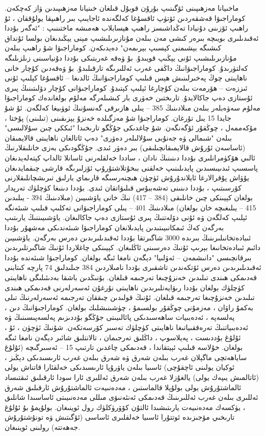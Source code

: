 \documentclass[a4paper]{article}
\begin{document}
\begin{flushright}
ماخىيانا مەزھىپىنى ئۆگىنىپ بۇرۇن قوبۇل قىلغان خىنيانا مەزھىپىدىن ۋاز كەچكەن. كوماراجىۋا قەشقەردىن ئۆتۈپ ئاقسۇغا كەلگەندە ئاجايىپ بىر راھىپقا يولۇققان ، ئۇ راھىپ ئۆزىنى دۇنيادا تەڭداشىسز راھىپ ھېسابلاب ھەمىشە ماختىنىپ : "ئەگەر بۇددا ئەقىدىلىرى بويىچە بىرەر كىشى مەن بىلەن مۇنازىرىلىشىپ مېنى يېڭىدىغان بولسا ئۇنداق كىشىگە بېشىمنى كېسىپ بېرىمەن" دەيدىكەن. كوماراجىۋا شۇ راھىپ بىلەن مۇنازىرىلىشىپ ئۇنى يېڭىپ قويىدۇ. بۇ ۋەقە غەربتىكى بۇددا دۇنياسىنى زىلزىلىگە كەلتۈرىدۇ. كوماراجىۋانىڭ داڭقى غەرب ئەللىرىگە تارقىلىدۇ. بۇ ۋەقەدىن كۇچار خانى ناھايىتى چوڭ پەخىرلىنىش ھېس قىلىپ كوماراجىۋانىڭ ئالدىغا – ئاقسۇغا كېلىپ ئۇنى ئىززەت – ھۆرمەت بىلەن كۇچارغا ئېلىپ كېتىدۇ. كوماراجىۋانى كۇچار دۆلىتىنىڭ پىرى ئۇستازى دەپ جاكالايدۇ. تارىختىن خەۋرى بار كىشىلەرگە مەلۇم بولغاندەك كوماراجىۋا مەلۇم سەۋەبلەر بىلەن مىلادىنىڭ 385 – يىلى ھازىرقى گەنسۇنىڭ ئوۋىيغا كەلگەن. ئۇ شۇ جايدا 15 يىل تۇرغان. كوماراجىۋا شۇ مەزگىلدە خەنزۇ يېزىقىنى (تىلىنى) پۇختا ، مۇكەممەل ، چوڭقۇر ئۆگەنگەن. شۇ چاغدىكى جۇڭگو تارىخىدا "ئىككى چىن سۇلالىسى" بىلەن "شىمالى ۋە جەنۇبى سۇلالىلەر دەۋرى" دەپ ئاتالغان ناھايىتى قالايمىقان (ئاساسەن ئۇرۇش قالايمىقانچىلىقى) بىر دەۋر ئىدى. جۇڭگودىكى بەزى خانلىقلارنىڭ ئالىي ھۆكۈمرانلىرى بۇددا دىنىنىڭ نادان ، ساددا خەلقلەرنى ئاسانلا ئالداپ كېتەلەيدىغان پاسسىپ ئىدىيىسىدىن پايدىلىنىپ خەلقنى بىخۇتلاشتۇرۇپ ئۆزلىرىگە قارشى چىقمايدىغان يۇۋاش پۇقرالارغا ئايلاندۇرۇش ئۈچۈن ھىچنەرسىگە قارىماي بارلىق تىرىشچانلىقلارنى كۆرسىتىپ ، بۇددا دىنىنى تەشەببۇس قىلىۋاتقان ئىدى. بۇددا دىنىغا كۈچلۈك تەرپدار بولغان كېيىنكى چىن خانلىقى (384 – 417) نىڭ خانى ياۋشىيىن (مىلادىنىڭ 394 - يىلىدىن 415 – يىلىغىچە خان بولغان) مىلادىنىڭ 401 – يىلى كوماراجىۋانى تەكلىپ قىلىپ شىئەنگە ئېلىپ كەلگەن ۋە ئۇنى دۆلەتنىڭ پىرى ئۇستازى دەپ جاكالىغان. ياۋشىيىننىڭ يارىتىپ بەرگەن كەڭ ئىمكانىيىتىدىن پايدىلانغان كوماراجىۋا شىئەندىكى مەشھۇر بۇددا ئىبادەتخانىلىرىنىڭ بىرىدە 3000 شاگىرتقا بۇددا ئەقىدىلىرىدىن دەرس بەرگەن. ياۋشىيىن دائىم ئىبادەتخانىغا بېرىپ ئۇنىڭ دەرسىنى ئاڭلىغان. كېيىنكى چاغلاردا ئۇنىڭ شاگىرتلىرىدىن بىرقانچىسى "دانىشمەن – ئەۋلىيا" دېگەن نامغا ئىگە بولغان. كوماراجىۋا شىئەندە بۇددا ئەقىدىلىرىدىن دەرس ئۆتكەندىن تاشقىرى بۇددا نامىلاردىن 384 جىلىدلىق 74 پارچە كىتابنى قەدىمكى ھىندى تىلىدىن خەنزۇچىغا تەرجىمە قىلغان. بۇنىڭدىن باشقا بەدىئىلىگى ناھايىتى كۈچلۈك بولغان بۇددا رىۋايەتلىرىدىن ناھايىتى نۇرغۇن ئەسەرلەرنى قەدىمكى ھىندى تىلىدىن خەنزۇچىغا تەرجىمە قىلغان. ئۇنىڭ قولىدىن چىققان تەرجىمە ئەسەرلەرنىڭ تىلى بەكمۇ راۋان ، مەزمۇنى چوڭقۇر بولسىمۇ ، چۈشىنىشلىك بولغان. كوماراجىۋانىڭ دىن ، پەلسەپە ، ئەدەبىيات ساھەسىدىكى پائالىيىتى جۇڭگو بۇددىزىم پەلسەپىسىنىڭ ۋە ئەدەبىياتنىڭ تەرەققىياتىغا ناھايىتى كۈچلۈك تەسىر كۆرسەتكەن. شۇنىڭ ئۈچۈن ، ئۇ ، ئۇلۇغ بۇددىست ، پەيلاسوپ ، داڭلىق تەرجىمان ، تالانتلىق شائىر دېگەن نامغا ئىگە بولغان. خۇلاسە قىلىپ ئېيتقاندا ، قەدىمكى چاغدىن تارتىپ 15 – ئەسىرگىچە (ئۇلۇغ ساياھەتچى ماگېلان غەرب بىلەن شەرق ۋە شەرق بىلەن غەرب ئارىسىدىكى دېڭىز ، ئوكيان يولىنى ئاچقۇچى) ئاسىيا بىلەن ياۋرۇپا ئارىسىدىكى خەلقئارا قاتناش يولى (ئاتالمىش يىپەك يولى) يالغۇزلا غەرب بىلەن شەرق ئەللىرى ئارا سودا ئارقىلىق ئىقتىساد ئالماشتۇرۇش يولى بولۇپلا قالماستىن ، مەدەنىيەت ئالماشتۇرۇش ئارقىلىق شەرق ئەللىرى بىلەن غەرب ئەللىرىنىڭ قەدىمكى ئەنئەنىۋى مىللى مەدەنىيىتى ئاساسىدا شانلىق ، يۈكسەك مەدەنىيەت يارىتىشىدا ئالتۇن كۆۋرۈكلۈك رول ئوينىغان. بولۇپمۇ بۇ ئۇلۇغ تارىخىي مۆجىزىدە ئوتتۇرا ئاسىيا خەلقلىرى ئاساسى (ئۆگىتىش ۋە تونۇشتۇرۇش جەھەتتە) رولىنى ئوينىغان.

\end{flushright}
\end{document}
